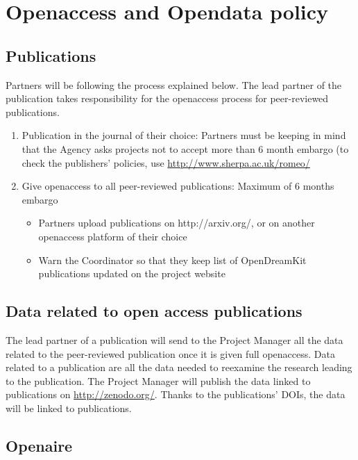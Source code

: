 \documentclass{deliverablereport}
\begin{document}
\section{Openaccess and Opendata policy}
\subsection{Publications}


Partners will be following the process explained below. The lead partner of the publication takes responsibility for the openaccess process for peer-reviewed publications.
\begin{enumerate}
\item{Publication in the journal of their choice:} Partners must be keeping in mind that the Agency asks projects not to accept more than 6 month embargo (to check the publishers’ policies, use \href{http://www.sherpa.ac.uk/romeo/}{http://www.sherpa.ac.uk/romeo/}
\item{Give openaccess to all peer-reviewed publications:} Maximum of 6 months embargo
\begin{itemize}
\item{Partners upload publications on http://arxiv.org/, or on another openaccess platform of their choice}
\item{Warn the Coordinator so that they keep list of OpenDreamKit publications updated on the project website}
\end{itemize}
\end{enumerate}


\subsection{Data related to open access publications}


The lead partner of a publication will send to the Project Manager all the data related to the peer-reviewed publication once it is given full openaccess. Data related to a publication are all the data needed to reexamine the research leading to the publication.
The Project Manager will publish the data linked to publications on \href{http://zenodo.org/}{http://zenodo.org/}. Thanks to the publications’ DOIs, the data will be linked to publications.



\subsection{Openaire}
\end{document}
